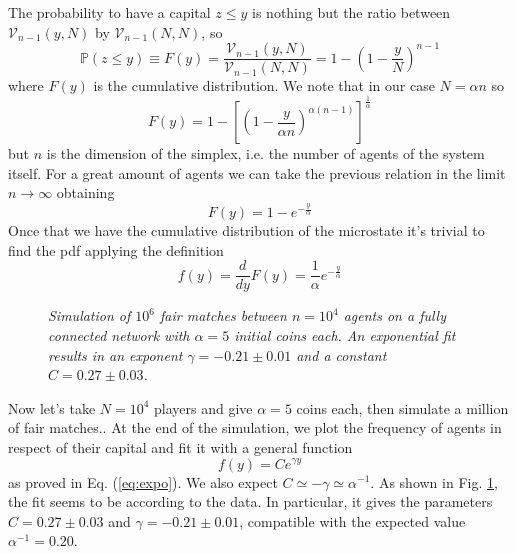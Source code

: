 The probability to have a capital $z \leq y$ is nothing but the ratio between $\mathcal{V}_{n-1}\left(y, N\right)$ by $\mathcal{V}_{n-1}\left(N, N\right)$, so
\begin{equation*}
    \mathbb{P}\left(z \leq y\right) \equiv F(y) = \frac{\mathcal{V}_{n-1}\left(y, N\right)}{\mathcal{V}_{n-1}\left(N, N\right)} = 1 - \left(1 - \frac{y}{N}\right)^{n-1}
\end{equation*}
where $F(y)$ is the cumulative distribution.
We note that in our case $N=\alpha n$ so
\begin{equation*}
    F(y) =  1 - \left[\left(1 - \frac{y}{\alpha n}\right)^{\alpha\left(n - 1\right)}\right]^\frac{1}{\alpha}
\end{equation*}
but $n$ is the dimension of the simplex, i.e. the number of agents of the system itself.
For a great amount of agents we can take the previous relation in the limit $n\to\infty$ obtaining
\begin{equation*}
    F(y) = 1 - e^{-\frac{y}{\alpha}}
\end{equation*}
Once that we have the cumulative distribution of the microstate it's trivial to find the pdf applying the definition
\begin{equation}
    f(y) = \frac{d}{dy}F(y) = \frac{1}{\alpha} e^{-\frac{y}{\alpha}}
    \label{eq:expo}
\end{equation}

\begin{figure}[ht!]
    \centering
    \scalebox{.7}{}
    \caption{\emph{Simulation of $10^6$ fair matches between $n = 10^4$ agents on a fully connected network with $\alpha = 5$ initial coins each. 
                    An exponential fit results in an exponent $\gamma = -0.21 \pm 0.01$ and a constant $C = 0.27 \pm 0.03$.}}
    \label{fig:expo}
\end{figure}
Now let's take $N = 10^4$ players and give $\alpha = 5$ coins each, then simulate a million of fair matches..
At the end of the simulation, we plot the frequency of agents in respect of their capital and fit \cite{root} it with a general function 
\begin{equation}
    f(y) = Ce^{\gamma y}
    \label{eq:generalExpo}
\end{equation}
as proved in Eq. (\ref{eq:expo}).
We  also expect $C \simeq -\gamma \simeq \alpha^{-1}$.
As shown in Fig. \ref{fig:expo}, the fit seems to be according to the data.
In particular, it gives the parameters $C = 0.27 \pm 0.03$ and $\gamma = -0.21 \pm 0.01$, compatible with the expected value $\alpha^{-1} = 0.20$.
